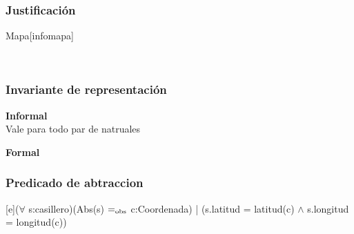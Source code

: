 \begin{Representacion}
\subsubsection{Justificación}
	\begin{Estructura}{Mapa}[infomapa]
		\begin{Tupla}[infomapa]
			\\
		\end{Tupla}
	\end{Estructura}

\subsubsection{Invariante de representación}

\textbf{Informal}\\

Vale para todo par de natruales

\textbf{Formal}\\


\subsubsection{Predicado de abtraccion}

[e]{($\forall$ s:casillero)(Abs(s) $=_{\mathrm{obs}}$ c:Coordenada) | (s.latitud = latitud(c) $\wedge$ s.longitud = longitud(c))}

\end{Representacion}

